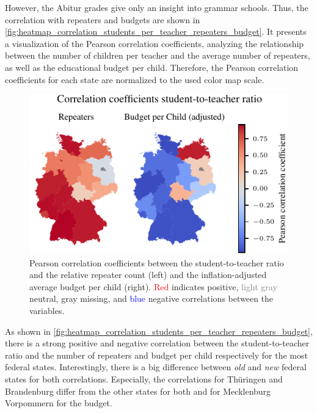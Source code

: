 
However, the Abitur grades give only an insight into grammar schools. Thus, the correlation with repeaters and budgets are shown in \autoref{fig:heatmap_correlation_students_per_teacher_repeaters_budget}. It presents a visualization of the Pearson correlation coefficients, analyzing the relationship between the number of children per teacher and the average number of repeaters, as well as the educational budget per child. Therefore, the Pearson correlation coefficients for each state are normalized to the used color map scale.

\begin{figure}[ht]
    \centering
    \includegraphics{fig/fig_heatmap_correlation_students_per_teacher_repeaters_budget.pdf}
    \caption{Pearson correlation coefficients between the student-to-teacher ratio and the relative repeater count (left) and the inflation-adjusted average budget per child (right). \textcolor{red}{Red} indicates positive, \textcolor{gray}{light gray} neutral, \textcolor{TUdark}{gray} missing, and \textcolor{blue}{blue} negative correlations between the variables.}
    \label{fig:heatmap_correlation_students_per_teacher_repeaters_budget}
\end{figure}

As shown in \autoref{fig:heatmap_correlation_students_per_teacher_repeaters_budget}, there is a strong positive and negative correlation between the student-to-teacher ratio and the number of repeaters and budget per child respectively for the most federal states. Interestingly, there is a big difference between \emph{old} and \emph{new} federal states for both correlations. Especially, the correlations for Thüringen and Brandenburg differ from the other states for both and for Mecklenburg Vorpommern for the budget.

